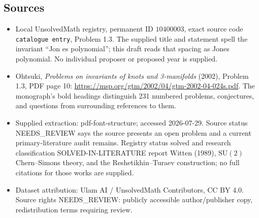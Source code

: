 \documentclass[11pt]{article}
\begin{document}
\subsection{Sources}
\begin{itemize}
\item Local UnsolvedMath registry, permanent ID \(10400003\), exact source code \texttt{catalogue entry}, Problem 1.3. The supplied title and statement spell the invariant ``Jon es polynomial''; this draft reads that spacing as Jones polynomial. No individual proposer or proposed year is supplied.
\item Ohtsuki, \emph{Problems on invariants of knots and 3-manifolds} (2002), Problem 1.3, PDF page 10: \url{https://msp.org/gtm/2002/04/gtm-2002-04-024s.pdf}. The monograph's bold headings distinguish 231 numbered problems, conjectures, and questions from surrounding references to them.
\item Supplied extraction: pdf-font-structure; accessed 2026-07-29. Source status NEEDS\_REVIEW says the source presents an open problem and a current primary-literature audit remains. Registry status solved and research classification SOLVED-IN-LITERATURE report Witten (1989), \(\mathrm{SU}(2)\) Chern--Simons theory, and the Reshetikhin--Turaev construction; no full citations for those works are supplied.
\item Dataset attribution: Ulam AI / UnsolvedMath Contributors, CC BY 4.0. Source rights NEEDS\_REVIEW: publicly accessible author/publisher copy, redistribution terms requiring review.
\end{itemize}
\end{document}
